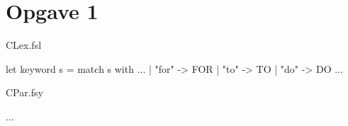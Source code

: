 \section{Opgave 1}
CLex.fsl
\begin{fs}
let keyword s =
    match s with
    ...
    | "for"     -> FOR
    | "to"      -> TO
    | "do"      -> DO
    ...
\end{fs}
CPar.fsy
\begin{fs}
...

\end{fs}
